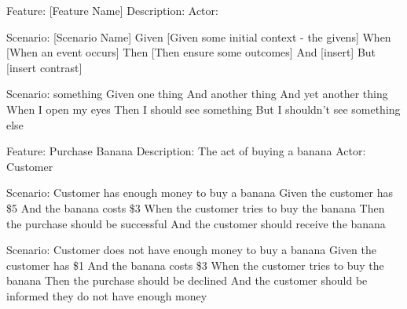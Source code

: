 Feature: [Feature Name] %
  Description: %
  Actor: %

  Scenario: [Scenario Name] %
    Given [Given some initial context - the givens] %
    When  [When an event occurs] %
    Then  [Then ensure some outcomes] %
    And [insert] %
    But [insert contrast] %


Scenario: something
  Given one thing
  And another thing
  And yet another thing
  When I open my eyes
  Then I should see something
  But I shouldn't see something else

Feature: Purchase Banana
  Description: The act of buying a banana
  Actor: Customer

  Scenario: Customer has enough money to buy a banana
    Given the customer has \$5
    And the banana costs \$3
    When the customer tries to buy the banana
    Then the purchase should be successful
    And the customer should receive the banana

  Scenario: Customer does not have enough money to buy a banana
    Given the customer has \$1
    And the banana costs \$3
    When the customer tries to buy the banana
    Then the purchase should be declined
    And the customer should be informed they do not have enough money



